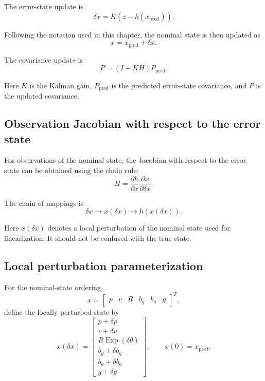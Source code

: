 \documentclass[11pt]{article}
\numberwithin{equation}{section}
\newcommand{\Exp}{\operatorname{Exp}}
\begin{document}
The error-state update is
\begin{equation}
\boxed{
\delta x
=
K\left(
z-h(x_{\mathrm{pred}})
\right).
}
\end{equation}

Following the notation used in this chapter, the nominal state is then
updated as
\begin{equation}
\boxed{
x=x_{\mathrm{pred}}+\delta x.
}
\end{equation}

The covariance update is
\begin{equation}
\boxed{
P=(I-KH)P_{\mathrm{pred}}.
}
\end{equation}

Here $K$ is the Kalman gain, $P_{\mathrm{pred}}$ is the predicted
error-state covariance, and $P$ is the updated covariance.

\subsection{Observation Jacobian with respect to the error state}

For observations of the nominal state, the Jacobian with respect to the
error state can be obtained using the chain rule:
\begin{equation}
\boxed{
H
=
\frac{\partial h}{\partial x}
\frac{\partial x}{\partial\delta x}.
}
\end{equation}

The chain of mappings is
\[
\boxed{
\delta x
\longrightarrow
x(\delta x)
\longrightarrow
h\!\left(x(\delta x)\right).
}
\]

Here $x(\delta x)$ denotes a local perturbation of the nominal state
used for linearization. It should not be confused with the true state.

\subsection{Local perturbation parameterization}

For the nominal-state ordering
\[
x=
\begin{bmatrix}
p&
v&
R&
b_g&
b_a&
g
\end{bmatrix}^{T},
\]
define the locally perturbed state by
\begin{equation}
\boxed{
x(\delta x)
=
\begin{bmatrix}
p+\delta p\\
v+\delta v\\
R\Exp(\delta\theta)\\
b_g+\delta b_g\\
b_a+\delta b_a\\
g+\delta g
\end{bmatrix},
\qquad
x(0)=x_{\mathrm{pred}}.
}
\end{equation}
\end{document}
